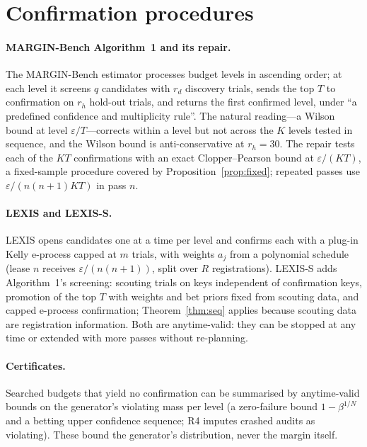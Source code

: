 \documentclass[pdflatex,sn-mathphys-num]{sn-jnl}
\theoremstyle{thmstyleone}
\theoremstyle{thmstyletwo}
\theoremstyle{thmstylethree}
\begin{document}
\section{Confirmation procedures}\label{sec:procedures}

\paragraph{MARGIN-Bench Algorithm~1 and its repair.} The MARGIN-Bench estimator processes budget levels in ascending order; at each level it screens $q$ candidates with $r_d$ discovery trials, sends the top $T$ to confirmation on $r_h$ hold-out trials, and returns the first confirmed level, under ``a predefined confidence and multiplicity rule''. The natural reading---a Wilson bound at level $\varepsilon/T$---corrects within a level but not across the $K$ levels tested in sequence, and the Wilson bound is anti-conservative at $r_h=30$. The repair tests each of the $KT$ confirmations with an exact Clopper--Pearson bound at $\varepsilon/(KT)$, a fixed-sample procedure covered by Proposition~\ref{prop:fixed}; repeated passes use $\varepsilon/(n(n+1)KT)$ in pass $n$.

\paragraph{LEXIS and LEXIS-S.} LEXIS opens candidates one at a time per level and confirms each with a plug-in Kelly e-process capped at $m$ trials, with weights $a_j$ from a polynomial schedule (lease $n$ receives $\varepsilon/(n(n+1))$, split over $R$ registrations). LEXIS-S adds Algorithm~1's screening: scouting trials on keys independent of confirmation keys, promotion of the top $T$ with weights and bet priors fixed from scouting data, and capped e-process confirmation; Theorem~\ref{thm:seq} applies because scouting data are registration information. Both are anytime-valid: they can be stopped at any time or extended with more passes without re-planning.

\paragraph{Certificates.} Searched budgets that yield no confirmation can be summarised by anytime-valid bounds on the generator's violating mass per level (a zero-failure bound $1-\beta^{1/N}$ and a betting upper confidence sequence; R4 imputes crashed audits as violating). These bound the generator's distribution, never the margin itself.
\end{document}
